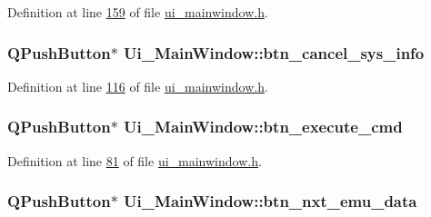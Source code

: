 Definition at line \hyperlink{a00052_source_l00159}{159} of file \hyperlink{a00052_source}{ui\+\_\+mainwindow.\+h}.

\hypertarget{a00027_a72415fe77c8f6eb7b13d16177a14b39a}{
\subsubsection[{btn\+\_\+cancel\+\_\+sys\+\_\+info}]{\setlength{\rightskip}{0pt plus 5cm}Q\+Push\+Button$\ast$ Ui\+\_\+\+Main\+Window\+::btn\+\_\+cancel\+\_\+sys\+\_\+info}}\label{a00027_a72415fe77c8f6eb7b13d16177a14b39a}


Definition at line \hyperlink{a00052_source_l00116}{116} of file \hyperlink{a00052_source}{ui\+\_\+mainwindow.\+h}.

\hypertarget{a00027_a9ea50d44e38316e4203933698cbc14a6}{
\subsubsection[{btn\+\_\+execute\+\_\+cmd}]{\setlength{\rightskip}{0pt plus 5cm}Q\+Push\+Button$\ast$ Ui\+\_\+\+Main\+Window\+::btn\+\_\+execute\+\_\+cmd}}\label{a00027_a9ea50d44e38316e4203933698cbc14a6}


Definition at line \hyperlink{a00052_source_l00081}{81} of file \hyperlink{a00052_source}{ui\+\_\+mainwindow.\+h}.

\hypertarget{a00027_a11126ea7922009f1354c9bfefb93f5e9}{
\subsubsection[{btn\+\_\+nxt\+\_\+emu\+\_\+data}]{\setlength{\rightskip}{0pt plus 5cm}Q\+Push\+Button$\ast$ Ui\+\_\+\+Main\+Window\+::btn\+\_\+nxt\+\_\+emu\+\_\+data}}\label{a00027_a11126ea7922009f1354c9bfefb93f5e9}


